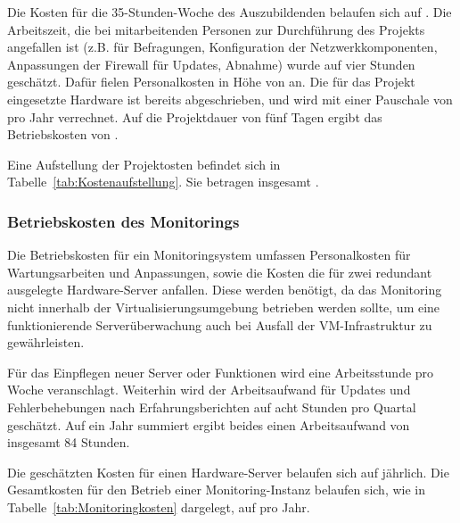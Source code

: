 Die Kosten für die 35-Stunden-Woche des Auszubildenden belaufen sich auf . Die Arbeitszeit, die bei mitarbeitenden Personen zur Durchführung des Projekts angefallen ist (z.B. für Befragungen, Konfiguration der Netzwerkkomponenten, Anpassungen der Firewall für Updates, Abnahme) wurde auf vier Stunden geschätzt. Dafür fielen Personalkosten in Höhe von  an. Die für das Projekt eingesetzte Hardware ist bereits abgeschrieben, und wird mit einer Pauschale von  pro Jahr verrechnet. Auf die Projektdauer von fünf Tagen ergibt das Betriebskosten von .

Eine Aufstellung der Projektosten befindet sich in Tabelle~\ref{tab:Kostenaufstellung}. Sie betragen insgesamt .

\subsubsection{Betriebskosten des Monitorings}
\label{sec:BetriebskostenMonitoring}
Die Betriebskosten für ein Monitoringsystem umfassen Personalkosten für Wartungsarbeiten und Anpassungen, sowie die Kosten die für zwei redundant ausgelegte Hardware-Server anfallen. Diese werden benötigt, da das Monitoring nicht innerhalb der Virtualisierungsumgebung betrieben werden sollte, um eine funktionierende Serverüberwachung auch bei Ausfall der VM-Infrastruktur zu gewährleisten.

Für das Einpflegen neuer Server oder Funktionen wird eine Arbeitsstunde pro Woche veranschlagt. Weiterhin wird der Arbeitsaufwand für Updates und Fehlerbehebungen nach Erfahrungsberichten auf acht Stunden pro Quartal geschätzt. Auf ein Jahr summiert ergibt beides einen Arbeitsaufwand von insgesamt 84 Stunden.

Die geschätzten Kosten für einen Hardware-Server belaufen sich auf  jährlich. Die Gesamtkosten für den Betrieb einer Monitoring-Instanz belaufen sich, wie in Tabelle~\ref{tab:Monitoringkosten} dargelegt, auf  pro Jahr.

